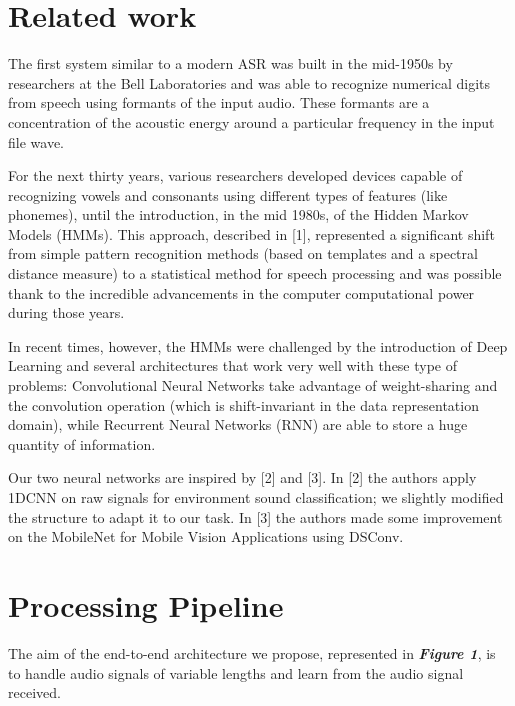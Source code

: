 \documentclass[conference]{IEEEtran}
\begin{document}

\section{Related work}
The first system similar to a modern ASR was built in the mid-1950s by researchers at the Bell Laboratories and was able to recognize numerical digits from speech using formants of the input audio. These formants are a concentration of the acoustic energy around a particular frequency in the input file wave. 

For the next thirty years, various researchers developed devices capable of recognizing vowels and consonants using different types of features (like phonemes), until the introduction, in the mid 1980s, of the Hidden Markov Models (HMMs). This approach, described in [1], represented a significant shift from simple pattern recognition methods (based on templates and a spectral distance measure) to a statistical method for speech processing and was possible thank to the incredible advancements in the computer computational power during those years.

In recent times, however, the HMMs were challenged by the introduction of Deep Learning and several architectures that work very well with these type of problems: Convolutional Neural Networks take advantage of weight-sharing and the convolution operation (which is shift-invariant in the data representation domain), while Recurrent Neural Networks (RNN) are able to store a huge quantity of information.

Our two neural networks are inspired by [2] and [3]. In [2] the authors apply 1DCNN on raw signals for environment sound classification; we slightly modified the structure to adapt it to our task. In [3] the authors made some improvement on the MobileNet for Mobile Vision Applications using DSConv. 
\hfill
\section{Processing Pipeline}
The aim of the end-to-end architecture we propose, represented in \textbf{\textit{Figure 1}}, is to handle audio signals of variable lengths and learn from the audio signal received.
\end{document}
